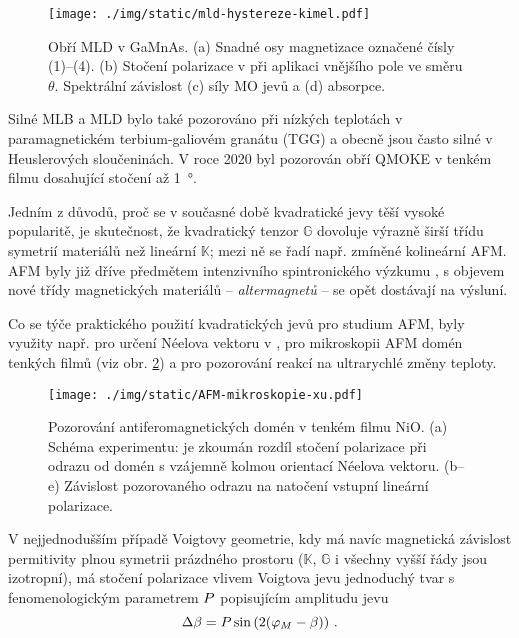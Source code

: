 \begin{figure}[htbp]
    \centering
    \texttt{[image: ./img/static/mld-hystereze-kimel.pdf]}
    \caption{Obří MLD v GaMnAs. (a) Snadné osy magnetizace označené čísly (1)--(4). (b) Stočení polarizace v při aplikaci vnějšího pole ve směru $\theta$. Spektrální závislost (c) síly MO jevů a (d) absorpce. \cite{kimelObservationGiantMagnetic2005}}
    \label{fig:obri-MLD}
\end{figure}

Silné MLB a MLD bylo také pozorováno při nízkých teplotách v paramagnetickém terbium-galiovém granátu (TGG)\cite{akbarLowTemperatureVoigt2017} a obecně jsou často silné v Heuslerových sloučeninách\cite{hamrleHugeQuadraticMagnetooptical2007}.
V roce 2020 byl pozorován obří QMOKE v tenkém filmu  dosahující stočení až \SI{1}{\degree}\cite{katsGiantQuadraticMagnetooptical2020}.

Jedním z důvodů, proč se v současné době kvadratické jevy těší vysoké popularitě, je skutečnost, že kvadratický tenzor $\mathbb{G}$ dovoluje výrazně širší třídu symetrií materiálů než lineární $\mathbb{K}$; mezi ně se řadí např. zmíněné kolineární AFM. 
AFM byly již dříve předmětem intenzivního spintronického výzkumu \cite{nemecAntiferromagneticOptospintronics2018,jungwirthAntiferromagneticSpintronics2016}, 
s objevem nové třídy magnetických materiálů -- \emph{altermagnetů}\cite{smejkalAltermagnetismSpinmomentumLocked2021} -- se opět dostávají na výsluní.

Co se týče praktického použití kvadratických jevů pro studium AFM, byly využity např. pro určení Néelova vektoru v \cite{saidlOpticalDeterminationNeel2017}, pro mikroskopii AFM domén\cite{xuImagingAntiferromagneticDomains2019} tenkých filmů  (viz obr. \ref{fig:AFM-mikroskopie-domen}) a pro pozorování reakcí  na ultrarychlé změny teploty\cite{yangMagnetoopticResponseMetallic2019}.

\begin{figure}[htbp]
    \centering
    \texttt{[image: ./img/static/AFM-mikroskopie-xu.pdf]}
    \caption{Pozorování antiferomagnetických domén v tenkém filmu NiO. (a) Schéma experimentu: je zkoumán rozdíl stočení polarizace při odrazu od domén s vzájemně kolmou orientací Néelova vektoru. (b--e) Závislost pozorovaného odrazu na natočení vstupní lineární polarizace. \cite{xuImagingAntiferromagneticDomains2019}}
    \label{fig:AFM-mikroskopie-domen}
\end{figure}

V nejjednodušším případě Voigtovy geometrie, kdy má navíc magnetická závislost permitivity plnou symetrii prázdného prostoru ($\mathbb{K}$, $\mathbb{G}$ i všechny vyšší řády jsou izotropní), má stočení polarizace vlivem Voigtova jevu jednoduchý tvar s fenomenologickým parametrem $P$ popisujícím amplitudu jevu\cite{tesarovaHighPrecisionMagnetic2012}
\begin{equation} 
\label{eqn:PMLD}
    \Delta \beta=P \sin\left(2(\varphi_M-\beta)\right) \,.
\end{equation}

